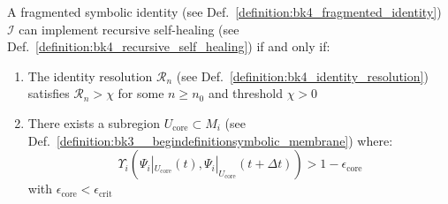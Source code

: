 \begin{theorem} \label{theorem:bk4_conditions_for_self_healing}
A fragmented symbolic identity (see Def.~\ref{definition:bk4_fragmented_identity}) $\mathcal{I}$ can implement recursive self-healing (see Def.~\ref{definition:bk4_recursive_self_healing}) if and only if:
\begin{enumerate}
    \item The identity resolution $\mathcal{R}_n$ (see Def.~\ref{definition:bk4_identity_resolution}) satisfies $\mathcal{R}_n > \chi$ for some $n \geq n_0$ and threshold $\chi > 0$
    \item There exists a subregion $U_{\text{core}} \subset M_i$ (see Def.~\ref{definition:bk3__begindefinitionsymbolic_membrane}) where:
    \begin{equation}
        \Upsilon_i(\Psi_i|_{U_{\text{core}}}(t), \Psi_i|_{U_{\text{core}}}(t+\Delta t)) > 1 - \epsilon_{\text{core}}
    \end{equation}
    with $\epsilon_{\text{core}} < \epsilon_{\text{crit}}$
\end{enumerate}
\end{theorem}
